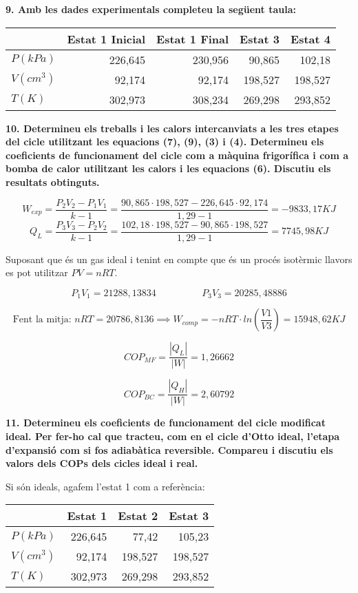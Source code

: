 \documentclass[a4paper]{article}
\begin{document}
\textbf{9. Amb les dades experimentals completeu la següent taula:}

\begin{center}
	\begin{tabular}{l|rrrr}
		& Estat 1 Inicial & Estat 1 Final & Estat 3 & Estat 4 \\
		\hline
		$P(kPa)$ & 226,645 & 230,956 & 90,865 & 102,18 \\
		$V(cm^3)$ & 92,174 & 92,174 & 198,527 & 198,527 \\
		$T(K)$ & 302,973 & 308,234 & 269,298 & 293,852 \\
	\end{tabular}
\end{center}

\textbf{10. Determineu els treballs i les calors intercanviats a les tres etapes del cicle utilitzant les equacions (7), (9), (3) i (4). Determineu els coeficients de funcionament del cicle com a màquina frigorífica i com a bomba de calor utilitzant les calors i les equacions (6). Discutiu els resultats obtinguts.}

$$ W_{exp} = \frac{P_2 V_2 - P_1 V_1}{k - 1} = 
\frac{90,865·198,527 - 226,645·92,174}{1,29 - 1} = \boxed{-9833,17 KJ} $$
$$ Q_L = \frac{P_3 V_3 - P_2 V_2}{k - 1} = 
\frac{102,18·198,527 - 90,865·198,527}{1,29-1} = \boxed{7745,98 KJ} $$

Suposant que és un gas ideal i tenint en compte que és un procés isotèrmic llavors es pot utilitzar $ PV = nRT$.

$$ P_1 V_1 = 21288,13834 \hspace{2cm} P_3 V_3 = 20285,48886 $$

$$ \text{Fent la mitja: } nRT = 20786,8136 \implies W_{comp} = -nRT·ln\left(\frac{V1}{V3}\right) = \boxed{15948,62 KJ} $$

$$ COP_{MF} = \frac{|Q_L|}{|W|} = \boxed{1,26662} $$

$$ COP_{BC} = \frac{|Q_H|}{|W|} = \boxed{2,60792} $$

\textbf{11. Determineu els coeficients de funcionament del cicle modificat ideal. Per fer-ho cal que tracteu, com en el cicle d'Otto ideal, l'etapa d'expansió com si fos adiabàtica reversible. Compareu i discutiu els valors dels COPs dels cicles ideal i real.}

Si són ideals, agafem l'estat 1 com a referència:

\begin{center}
	\begin{tabular}{l|rrr}
		& Estat 1 & Estat 2 & Estat 3 \\
		\hline
		$P(kPa)$ & 226,645 & 77,42 & 105,23 \\
		$V(cm^3)$ & 92,174 & 198,527 & 198,527 \\
		$T(K)$ & 302,973 & 269,298 & 293,852
	\end{tabular}
\end{center}
\end{document}
